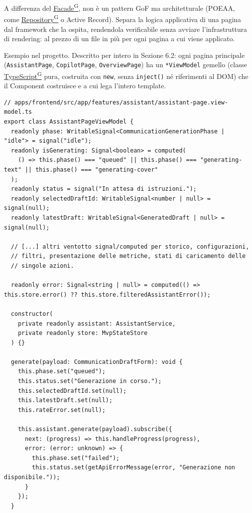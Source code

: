 \documentclass[a4paper,12pt]{article}
\providecommand{\glslink}[2]{\href{https://alittlebyte-19.github.io/Documentazione/glossario.html\#gls-#1}{\underline{#2}\textsuperscript{\scriptsize G}}}
\begin{document}
\begin{sloppypar}
A differenza del \glslink{facade}{Facade}, non è un pattern GoF ma architetturale (POEAA, come \glslink{repository}{Repository} o Active Record). Separa la logica applicativa di una pagina dal framework che la ospita, rendendola verificabile senza avviare l'infrastruttura di rendering: al prezzo di un file in più per ogni pagina a cui viene applicato.

Esempio nel progetto. Descritto per intero in Sezione 6.2: ogni pagina principale (\texttt{AssistantPage}, \texttt{CopilotPage}, \texttt{OverviewPage}) ha un \texttt{*ViewModel} gemello (classe \glslink{typescript}{TypeScript} pura, costruita con \texttt{new}, senza \texttt{inject()} né riferimenti al DOM) che il Component costruisce e a cui lega l'intero template.

\begin{lstlisting}[style=tslisting, caption={AssistantPageViewModel -- classe pura costruita con new(), niente inject() né riferimenti al DOM}]
// apps/frontend/src/app/features/assistant/assistant-page.view-model.ts
export class AssistantPageViewModel {
  readonly phase: WritableSignal<CommunicationGenerationPhase | "idle"> = signal("idle");
  readonly isGenerating: Signal<boolean> = computed(
    () => this.phase() === "queued" || this.phase() === "generating-text" || this.phase() === "generating-cover"
  );
  readonly status = signal("In attesa di istruzioni.");
  readonly selectedDraftId: WritableSignal<number | null> = signal(null);
  readonly latestDraft: WritableSignal<GeneratedDraft | null> = signal(null);

  // [...] altri ventotto signal/computed per storico, configurazioni,
  // filtri, presentazione delle metriche, stati di caricamento delle
  // singole azioni.

  readonly error: Signal<string | null> = computed(() => this.store.error() ?? this.store.filteredAssistantError());

  constructor(
    private readonly assistant: AssistantService,
    private readonly store: MvpStateStore
  ) {}

  generate(payload: CommunicationDraftForm): void {
    this.phase.set("queued");
    this.status.set("Generazione in corso.");
    this.selectedDraftId.set(null);
    this.latestDraft.set(null);
    this.rateError.set(null);

    this.assistant.generate(payload).subscribe({
      next: (progress) => this.handleProgress(progress),
      error: (error: unknown) => {
        this.phase.set("failed");
        this.status.set(getApiErrorMessage(error, "Generazione non disponibile."));
      }
    });
  }


\end{lstlisting}
\end{sloppypar}
\end{document}
